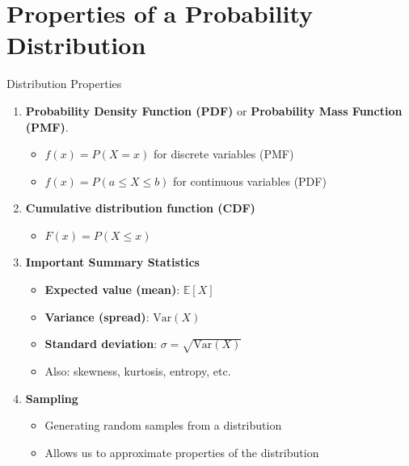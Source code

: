 \documentclass{beamer}
\begin{document}


\section{Properties of a Probability Distribution}

\begin{frame}{Distribution Properties}

\begin{enumerate}
  \item \textbf{Probability Density Function (PDF)} or \textbf{Probability Mass Function (PMF)}.
    \begin{itemize}
    \item $f(x) = P(X = x)$ for discrete variables (PMF)
    \item $f(x) = P(a \leq X \leq b)$ for continuous variables (PDF)
  \end{itemize}

  \item \textbf{Cumulative distribution function (CDF)}
  \begin{itemize}
    \item $F(x) = P(X \leq x)$
  \end{itemize}

  \item \textbf{Important Summary Statistics}
  \begin{itemize}
  \item \textbf{Expected value (mean)}: $\mathbb{E}[X]$
  \item \textbf{Variance (spread)}: $\text{Var}(X)$
  \item \textbf{Standard deviation}: $\sigma = \sqrt{\text{Var}(X)}$
  \item Also: skewness, kurtosis, entropy, etc.
  \end{itemize}

  \item \textbf{Sampling}
  \begin{itemize}
  \item Generating random samples from a distribution
    \item Allows us to approximate properties of the distribution
  \end{itemize}
\end{enumerate}

\end{frame}
\end{document}
